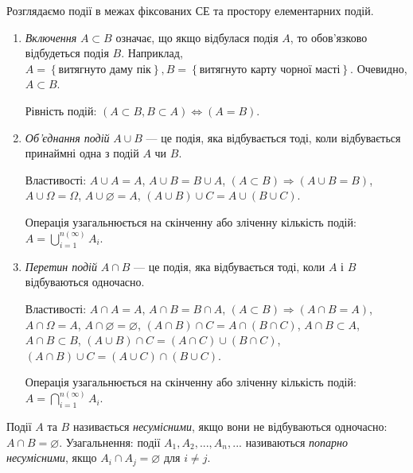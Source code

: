 \begin{remark}
    Розглядаємо події в межах фіксованих СЕ та простору елементарних подій.
\end{remark}
\begin{enumerate}
    \item \emph{Включення} $A \subset B$ означає, що якщо відбулася подія $A$, то обов'язково відбудеться подія $B$.
    Наприклад, $A = \left\{\text{витягнуто даму пік}\right\}, B = \left\{\text{витягнуто карту чорної масті}\right\}$. 
    Очевидно, $A\subset B$.

    Рівність подій: $\left( A \subset B, B \subset A \right) \iff \left( A = B\right)$.
    \item \emph{Об'єднання подій} $A \cup B$ --- це подія, яка відбувається тоді, коли відбувається
    принаймні одна з подій $A$ чи $B$.

    Властивості: $A \cup A = A$,  $A \cup B = B \cup A$, $\left( A \subset B \right) \Rightarrow \left( A \cup B = B \right)$, 
    $A \cup \Omega = \Omega$, $A \cup \varnothing = A$, $\left( A \cup B \right) \cup C = A \cup \left( B \cup C \right)$.

    Операція узагальнюється на скінченну або зліченну кількість подій: $A = \bigcup\limits_{i=1}^{n \left( \infty \right)} A_i$.
    \item \emph{Перетин подій} $A \cap B$ --- це подія, яка відбувається тоді, коли $A$ і $B$ відбуваються одночасно.

    Властивості: $A \cap A = A$,  $A \cap B = B \cap A$, $\left( A \subset B \right) \Rightarrow \left( A \cap B = A \right)$, 
    $A \cap \Omega = A$, $A \cap \varnothing = \varnothing$, $\left( A \cap B \right) \cap C = A \cap \left( B \cap C \right)$,
    $A \cap B \subset A$, $A \cap B \subset B$, $\left( A \cup B \right) \cap C = \left( A \cap C \right) \cup \left( B \cap C \right)$,
    $\left( A \cap B \right) \cup C = \left( A \cup C \right) \cap \left( B \cup C \right)$.

    Операція узагальнюється на скінченну або зліченну кількість подій: $A = \bigcap\limits_{i=1}^{n \left( \infty \right)} A_i$.
\end{enumerate}
\begin{definition}
    Події $A$ та $B$ називається \emph{несумісними}, якщо вони не відбуваються одночасно: $A \cap B = \varnothing$.
    Узагальнення: події $A_1, A_2, ..., A_n, ...$ називаються \emph{попарно несумісними}, якщо $A_i \cap A_j = \varnothing$ для $i \neq j$.
\end{definition}
